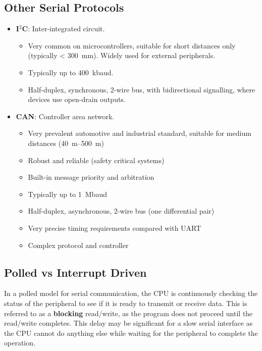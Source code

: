 \documentclass{report}
\begin{document}
\subsection{Other Serial Protocols}
\begin{itemize}
    \item \textbf{I\({}^2\)C}: Inter-integrated circuit.
          \begin{itemize}
              \item Very common on microcontrollers, suitable for short distances only (typically < \qty{300}{mm}). Widely used for external peripherals.
              \item Typically up to \qty{400}{kbaud}.
              \item Half-duplex, synchronous, 2-wire bus, with bidirectional signalling, where devices use open-drain outputs.
          \end{itemize}
    \item \textbf{CAN}: Controller area network.
          \begin{itemize}
              \item Very prevalent automotive and industrial standard, suitable for medium distances (\qtyrange{40}{500}{m})
              \item Robust and reliable (safety critical systems)
              \item Built-in message priority and arbitration
              \item Typically up to \qty{1}{Mbaud}
              \item Half-duplex, asynchronous, 2-wire bus (one differential pair)
              \item Very precise timing requirements compared with UART
              \item Complex protocol and controller
          \end{itemize}
\end{itemize}
\subsection{Polled vs Interrupt Driven}
In a polled model for serial communication, the CPU is continuously checking the status of the peripheral to see if it is ready to transmit or receive data.
This is referred to as a \textbf{blocking} read/write, as the program does not proceed until the read/write completes.
This delay may be significant for a slow serial interface as the CPU cannot do anything else while waiting for the peripheral to complete the operation.
\end{document}
